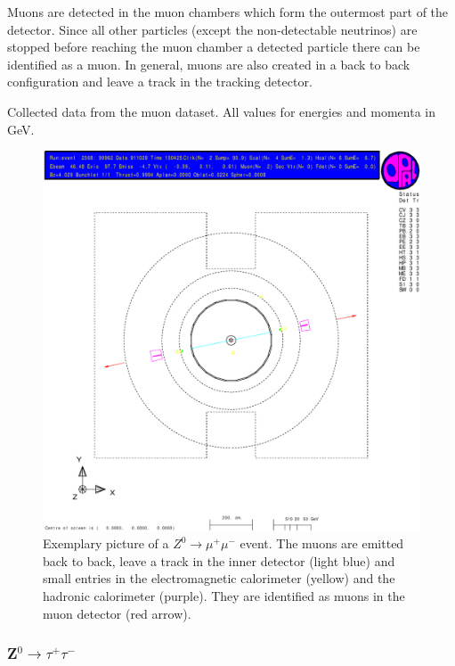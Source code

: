 \documentclass[11pt, a4paper]{article}
\numberwithin{equation}{section}
\begin{document}
Muons are detected in the muon chambers which form the outermost part of the detector.
Since all other particles (except the non-detectable neutrinos) are stopped before reaching the muon chamber a detected particle there can be identified as a muon. 
In general, muons are also created in a back to back configuration and leave a track in the tracking detector.
\begin{table}
	\centering
	
	\caption{Collected data from the muon dataset. All values for energies and momenta in \si{GeV}.}
\end{table}
\begin{figure}[h]
	\centering
	\includegraphics[width=\textwidth]{./data/tag1/mm_pics/cropped/mm_02}
	\caption{Exemplary picture of a $Z^0\rightarrow \mu^+\mu^-$ event. The muons are emitted back to back, leave a track in the inner detector (light blue) and small entries in the electromagnetic calorimeter (yellow) and the hadronic calorimeter (purple). They are identified as muons in the muon detector (red arrow).}
\end{figure}
\clearpage
\subsubsection{Z$^0\rightarrow \tau^+\tau^-$}
\end{document}

